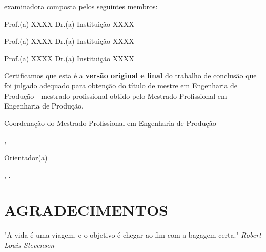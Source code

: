     examinadora composta pelos seguintes membros:

    \vspace{1cm}    
    Prof.(a) XXXX Dr.(a)
    Instituição XXXX
    
    \vspace{1cm}    
    Prof.(a) XXXX Dr.(a)
    Instituição XXXX
    
    \vspace{1cm}    
    Prof.(a) XXXX Dr.(a)
    Instituição XXXX
    
    \vspace{1cm}    
    \justifying \noindent \hspace{1.5cm} Certificamos que esta é a \textbf{versão original e final} do trabalho de conclusão que foi julgado adequado para obtenção do título de mestre em Engenharia de Produção - mestrado profissional obtido pelo Mestrado Profissional em Engenharia de Produção.

    \center
    \vspace{3cm}
    \hspace{2cm} \hrulefill \hspace{2cm}

    Coordenação do Mestrado Profissional em Engenharia de Produção

    \vspace{1cm}
    \hspace{2cm} \hrulefill \hspace{2cm}

    \Supervisor,

    Orientador(a)

    \null\vfil
    \Location, \Year.

    \pagebreak

    \null\vfil
    \begin{changemargin}{5cm}{0cm} 
        
    \end{changemargin}
    \pagebreak

    \center \fontsize{12}{14} \selectfont \section*{AGRADECIMENTOS}
    \justifying
    \hspace{1.5cm} 
    \pagebreak

    \null\vfil
    \begin{changemargin}{5cm}{0cm} 
        \justifying
        \hspace{1.5cm} "A vida é uma viagem, e o objetivo é chegar ao fim com a bagagem certa." \textit{Robert Louis Stevenson}
    \end{changemargin}
    \pagebreak

